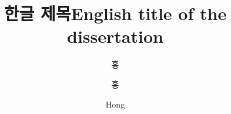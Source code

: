 \documentclass[doctor,english,final,pdfdoc]{kaist-ucs-improved}
\title[korean] {한글 제목}
\title[english]{English title of the dissertation}
\author[korean]{홍}{길 동}
\author[korean2]{홍}{길동}    %
\author[chinese]{}{} %
\author[english]{Hong}{Gildong}
\begin{document}

		\thesisinfo
   
   

		

    \addtocounter{pagemarker}{1}                 %
    \newpage  
  
		\iffinal
			\tableofcontents

			\listoftables

			\listoffigures
		\else
			\label{paperlastromanpagelabel} %
		\fi

\end{document}

